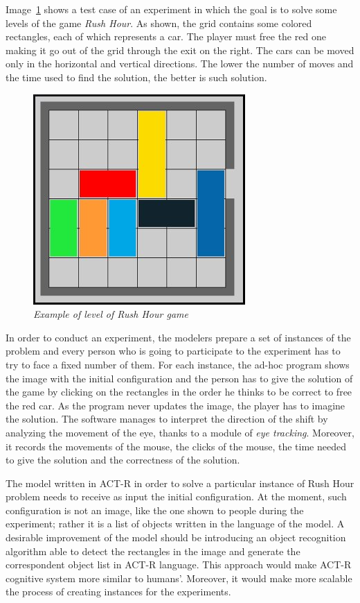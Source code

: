  
	Image~\ref{fig:RushHourHuman} shows a test case of an experiment in which the goal is to solve some levels of the game \emph{Rush Hour}. As shown, the grid contains some colored rectangles, each of which represents a car. The player must free the red one making it go out of the grid through the exit on the right. The cars can be moved only in the horizontal and vertical directions. %
	The lower the number of moves and the time used to find the solution, the better is such solution.

	\begin{figure}[!h]
	  \begin{center} 
	    \includegraphics[scale=0.6]{images/ch_03/originale.jpg}	
	  \end{center} 
	  \caption{\textit{Example of level of Rush Hour game}}
	  \label{fig:RushHourHuman}	
  	\end{figure}
	
	In order to conduct an experiment, the modelers prepare a set of instances of the problem and every person who is going to participate to the experiment has to try to face a fixed number of them.
	For each instance, the ad-hoc program shows the image with the initial configuration and the person has to give the solution of the game by clicking on the rectangles in the order he thinks to be correct to free the red car. As the program never updates the image, the player has to imagine the solution. The software manages to interpret the direction of the shift by analyzing the movement of the eye, thanks to a module of \emph{eye tracking}. Moreover, it records the movements of the mouse, the clicks of the mouse, the time needed to give the solution and the correctness of the solution. 

	The model written in ACT-R in order to solve a particular instance of Rush Hour problem needs to receive as input the initial configuration. At the moment, such configuration is not an image, like the one shown to people during the experiment; rather it is a list of objects written in the language of the model.
	A desirable improvement of the model should be introducing an object recognition algorithm able to detect the rectangles in the image and generate the correspondent object list in ACT-R language. 
	This approach would make ACT-R cognitive system more similar to humans'. Moreover, it would make more scalable the process of creating instances for the experiments. 


